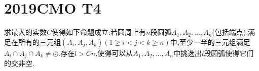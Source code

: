 \documentclass[]{article}
\title{}
\author{}
\date{}
\begin{document}
\maketitle
\section{2019CMO T4}{
求最大的实数$C$使得如下命题成立:若圆周上有$n$段圆弧$A_1,A_2,…,A_n$(包括端点),满足在所有的三元组$(A_i,A_j,A_k)(1\geq i<j<k \geq n)$中,至少一半的三元组满足$A_i\cap A_j\cap A_k \ne  \oslash $.存在$l>Cn$,使得可以从$A_1,A_2,…,A_n$中挑选出$l$段圆弧使得它们的交非空.
}
\end{document}
